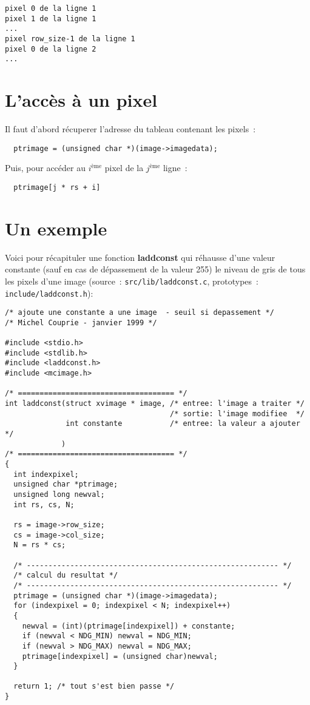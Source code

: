 \begin{verbatim}
pixel 0 de la ligne 1
pixel 1 de la ligne 1
...
pixel row_size-1 de la ligne 1
pixel 0 de la ligne 2
...
\end{verbatim}

\section{L'acc\`es \`a un pixel}

Il faut d'abord r\'ecuperer l'adresse du tableau contenant les pixels~:

\begin{verbatim}
  ptrimage = (unsigned char *)(image->imagedata);
\end{verbatim}

Puis, pour acc\'eder au $i^{\mbox{\`eme}}$ pixel de la
$j^{\mbox{\`eme}}$ ligne~:

\begin{verbatim}
  ptrimage[j * rs + i]
\end{verbatim}

\section{Un exemple}

Voici pour r\'ecapituler une fonction {\bf laddconst} qui 
r\'ehausse d'une valeur constante (sauf en cas de d\'epassement
de la valeur 255) le niveau de gris de tous les pixels d'une
image (source~: \verb|src/lib/laddconst.c|, prototypes~: 
\verb|include/laddconst.h|):

\begin{verbatim}
/* ajoute une constante a une image  - seuil si depassement */
/* Michel Couprie - janvier 1999 */

#include <stdio.h>
#include <stdlib.h>
#include <laddconst.h>
#include <mcimage.h>

/* ==================================== */
int laddconst(struct xvimage * image, /* entree: l'image a traiter */
                                      /* sortie: l'image modifiee  */
              int constante           /* entree: la valeur a ajouter */
             )
/* ==================================== */
{
  int indexpixel;
  unsigned char *ptrimage;
  unsigned long newval;
  int rs, cs, N;

  rs = image->row_size;
  cs = image->col_size;
  N = rs * cs;
  
  /* ---------------------------------------------------------- */
  /* calcul du resultat */
  /* ---------------------------------------------------------- */
  ptrimage = (unsigned char *)(image->imagedata);
  for (indexpixel = 0; indexpixel < N; indexpixel++)
  {
    newval = (int)(ptrimage[indexpixel]) + constante;
    if (newval < NDG_MIN) newval = NDG_MIN;
    if (newval > NDG_MAX) newval = NDG_MAX;
    ptrimage[indexpixel] = (unsigned char)newval;
  }

  return 1; /* tout s'est bien passe */
}
\end{verbatim}

